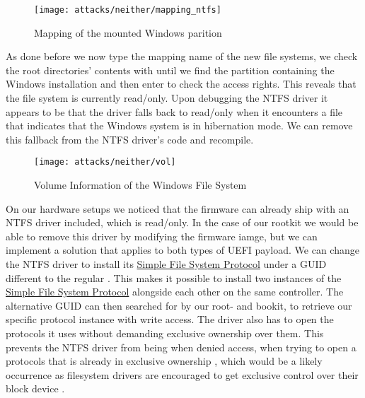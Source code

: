 \begin{figure}[htb]
    \centering
    \texttt{[image: attacks/neither/mapping\_ntfs]}
    \caption{Mapping of the mounted Windows parition}
    \label{fig:mapping-ntfs}
\end{figure}

As done before we now type the mapping name of the new file systems, we check the root directories' contents with  until we find the partition containing the Windows installation and then enter  to check the access rights.
This reveals that the file system is currently read\-/only.
Upon debugging the \ac{NTFS} driver it appears to be that the driver falls back to read\-/only when it encounters a file that indicates that the Windows system is in hibernation mode.
We can remove this fallback from the \ac{NTFS} driver's code and recompile.


\begin{figure}[htb]
    \centering
    \texttt{[image: attacks/neither/vol]}
    \caption{Volume Information of the Windows File System}
    \label{fig:mapping-ntfs}
\end{figure}

On our hardware setups we noticed that the firmware can already ship with an \ac{NTFS} driver included, which is read\-/only.
In the case of our rootkit we would be able to remove this driver by modifying the firmware iamge, but we can implement a solution that applies to both types of \ac{UEFI} payload.
We can change the \ac{NTFS} driver to install its \hyperref[lst:simple-file-system-protocol]{Simple File System Protocol} under a \ac{GUID} different to the regular .
This makes it possible to install two instances of the \hyperref[lst:simple-file-system-protocol]{Simple File System Protocol} alongside each other on the same controller.
The alternative \ac{GUID} can then searched for by our root- and bookit, to retrieve our specific protocol instance with write access.
The driver also has to open the protocols it uses without demanding exclusive ownership over them.
This prevents the \ac{NTFS} driver from being when denied access, when trying to open a protocols that is already in exclusive ownership \cite[Section 7.3]{uefi-spec}, which would be a likely occurrence as filesystem drivers are encouraged to get exclusive control over their block device \cite[Section 13.5]{uefi-spec}.

